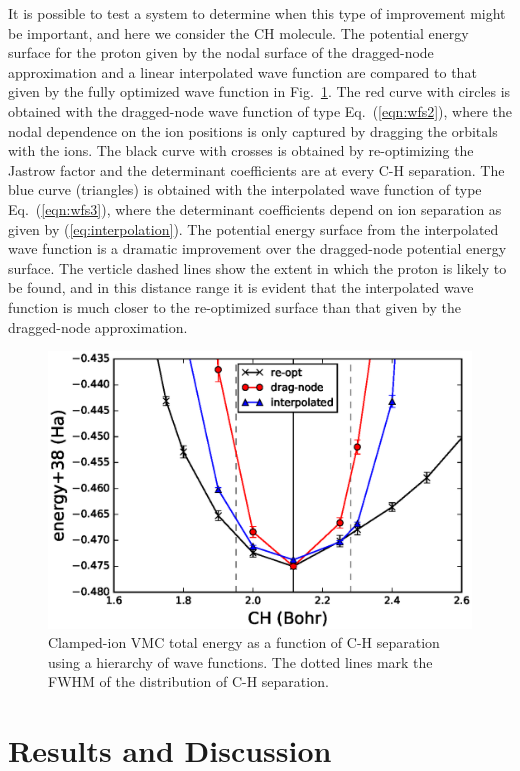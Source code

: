 \documentclass[aip,jcp,numerical,reprint]{revtex4-1}
\begin{document}
It is possible to test a system to determine when this type of improvement might be important, and here we consider the CH molecule.  The potential energy surface for the proton given by the nodal surface of the dragged-node approximation and a linear interpolated wave function are compared to that given by the fully optimized wave function in Fig.~\ref{fig:ch-cold}. The red curve with circles is obtained with the dragged-node wave function of type Eq.~(\ref{eqn:wfs2}), where the nodal dependence on the ion positions is only captured by dragging the orbitals with the ions. The black curve with crosses is obtained by re-optimizing the Jastrow factor and the determinant coefficients are at every C-H separation. The blue curve (triangles) is obtained with the interpolated wave function of type Eq.~(\ref{eqn:wfs3}), where the determinant coefficients depend on ion separation as given by (\ref{eq:interpolation}). The potential energy surface from the interpolated wave function is a dramatic improvement over the dragged-node potential energy surface.  The verticle dashed lines show the extent in which the proton is likely to be found, and in this distance range it is evident that the interpolated wave function is much closer to the re-optimized surface than that given by the dragged-node approximation. 

\begin{figure}[h]
\includegraphics[scale=0.5]{CH-cold}
\caption{Clamped-ion VMC total energy as a function of C-H separation using a hierarchy of wave functions. The dotted lines mark the FWHM of the distribution of C-H separation. \label{fig:ch-cold}}
\end{figure}

\section{Results and Discussion}
\end{document}
